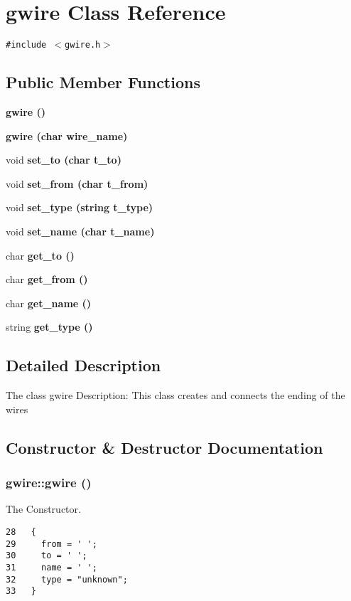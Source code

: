 \section{gwire Class Reference}
\label{classgwire}
{\tt \#include $<$gwire.h$>$}

\subsection*{Public Member Functions}
\begin{CompactItemize}
\item 
\bf{gwire} ()
\item 
\bf{gwire} (char wire\_\-name)
\item 
void \bf{set\_\-to} (char t\_\-to)
\item 
void \bf{set\_\-from} (char t\_\-from)
\item 
void \bf{set\_\-type} (string t\_\-type)
\item 
void \bf{set\_\-name} (char t\_\-name)
\item 
char \bf{get\_\-to} ()
\item 
char \bf{get\_\-from} ()
\item 
char \bf{get\_\-name} ()
\item 
string \bf{get\_\-type} ()
\end{CompactItemize}


\subsection{Detailed Description}
The class gwire Description: This class creates and connects the ending of the wires 



\subsection{Constructor \& Destructor Documentation}
\subsubsection{\setlength{\rightskip}{0pt plus 5cm}gwire::gwire ()\hspace{0.3cm}{\tt  [inline]}}\label{classgwire_b2c0d07690fc521588d4d6256de479f7}


The Constructor. 

\begin{Code}\begin{verbatim}28   {
29     from = ' ';
30     to = ' ';
31     name = ' ';
32     type = "unknown";
33   } 
\end{verbatim}\end{Code}


